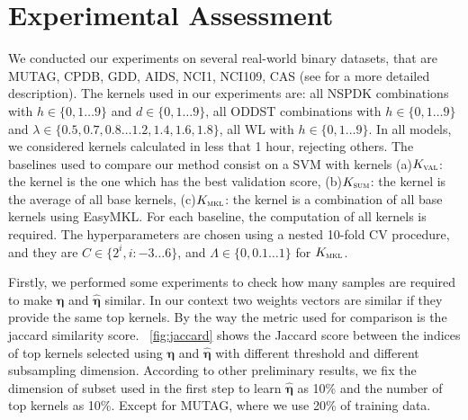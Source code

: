 \documentclass{esannV2}
\newcommand{\1}{{\bf 1}}
\newcommand{\kval}{$K_{\textsc{val}}$}
\newcommand{\ksum}{$K_{\textsc{sum}}$}
\newcommand{\kmkl}{$K_{\textsc{mkl}}$}
\begin{document}
\section{Experimental Assessment}
We conducted our experiments on several real-world binary datasets, that are MUTAG, CPDB, GDD, AIDS, NCI1, NCI109, CAS (see \cite{DaSanMartino2016,Shervashidze2011} for a more detailed description).
%
The kernels used in our experiments are: all NSPDK combinations with $h \in \{0,1\dots9\}$ and $d \in \{0,1\dots9\}$, all ODDST combinations with $h \in \{0,1\dots9\}$ and $\lambda \in \{0.5, 0.7,0.8\dots1.2,1.4,1.6,1.8\}$, all WL with $h \in \{0,1\dots9\}$.
In all models, we considered kernels calculated in less that 1 hour, rejecting others.
The baselines used to compare our method consist on a SVM with kernels (a)\kval: the kernel is the one which has the best validation score, (b)\ksum: the kernel is the average of all base kernels, (c)\kmkl: the kernel is a combination of all base kernels using EasyMKL.
For each baseline, the computation of all kernels is required.
The hyperparameters are chosen using a nested 10-fold CV procedure, and they are $C\in\{2^i, i:-3\dots6\}$, and $\Lambda\in\{0,0.1\dots1\}$ for \kmkl.


Firstly, we performed some experiments to check how many samples are required to make $\boldsymbol{\eta}$ and $\hat{\boldsymbol{\eta}}$ similar.
In our context two weights vectors are similar if they provide the same top kernels. By the way the metric used for comparison is the jaccard similarity score. \figurename\ \ref{fig:jaccard} shows the Jaccard score between the indices of top kernels selected using $\boldsymbol{\eta}$ and $\hat{\boldsymbol{\eta}}$ with different threshold and different subsampling dimension.
According to other preliminary results, we fix the dimension of subset used in the first step to learn $\hat{\boldsymbol{\eta}}$ as 10\% and the number of top kernels as 10\%. Except for MUTAG, where we use 20\% of training data.
\end{document}
